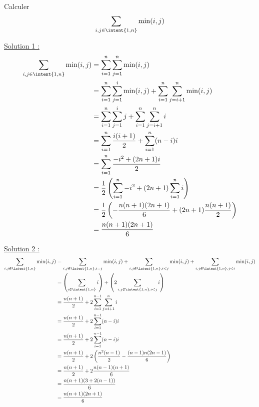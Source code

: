 



\begin{exercice}
Calculer 
$$\sum_{i,j \in \intent{1,n}} \min(i,j)$$
\end{exercice}


\begin{correction}
\underline{Solution 1 :} 
\begin{align*}
\sum_{i,j \in \intent{1,n}} \min(i,j) &= \sum_{i=1}^n \sum_{j=1}^n\min(i,j)\\
												&= \sum_{i=1}^n \sum_{j=1}^i\min(i,j) + \sum_{i=1}^n \sum_{j=i+1}^n\min(i,j)\\
												&= \sum_{i=1}^n \sum_{j=1}^i j  + \sum_{i=1}^n \sum_{j=i+1}^n i\\
													&= \sum_{i=1}^n \frac{i(i+1)}{2}+ \sum_{i=1}^n (n-i) i\\
													&= \sum_{i=1}^n \frac{-i^2+(2n+1)i}{2}\\		
													&= \frac{1}{2} \left( \sum_{i=1}^n -i^2  + (2n+1)\sum_{i=1}^ni \right)\\																					&= \frac{1}{2} \left(-\frac{n(n+1)(2n+1)}{6} +(2n+1)\frac{n(n+1)}{2}\right)\\											
													&=\frac{n(n+1)(2n+1)}{6} 
\end{align*}



\underline{Solution 2 :}
\begin{align*}
\sum_{i,j \in \intent{1,n}} \min(i,j)  &= \sum_{i,j \in \intent{1,n}, i=j} \min(i,j)  +\sum_{i,j \in \intent{1,n}, i<j } \min(i,j)  + \sum_{i,j \in \intent{1,n}, j<i } \min(i,j) \\
										&=\left( \sum_{i \in \intent{1,n} } i \right) +\left(2\sum_{i,j \in \intent{1,n}, i< j } i \right)\\
										&= \frac{n(n+1)}{2} + 2 \sum_{i=1}^{n-1}\sum_{j=i+1}^n i \\
										&= \frac{n(n+1)}{2} + 2 \sum_{i=1}^{n-1}(n-i) i \\
										&= \frac{n(n+1)}{2} + 2 \sum_{i=1}^{n-1}(n-i) i \\
										&= \frac{n(n+1)}{2} + 2 \left( \frac{n^2(n-1)}{2}  - \frac{(n-1)n(2n-1)}{6}     \right)  \\
											&= \frac{n(n+1)}{2} + 2 \frac{n(n-1)(n+1)}{6} \\
											&= \frac{n(n+1) (3 +2(n-1))}{6} \\
											&= \frac{n(n+1) (2n+1)}{6} 
\end{align*}


\end{correction}